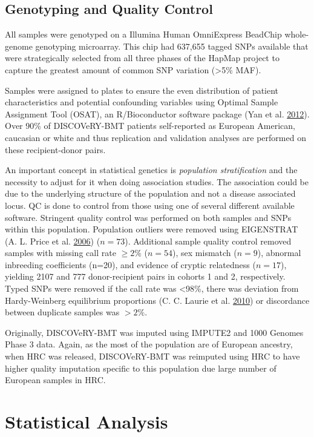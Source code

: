 \documentclass[]{DissertateOSU}
\begin{document}
\subsection{Genotyping and Quality
Control}\label{genotyping-and-quality-control}

All samples were genotyped on a Illumina Human OmniExpress BeadChip
whole-genome genotyping microarray. This chip had 637,655 tagged SNPs
available that were strategically selected from all three phases of the
HapMap project to capture the greatest amount of common SNP variation
(\textgreater{}5\% MAF).

Samples were assigned to plates to ensure the even distribution of
patient characteristics and potential confounding variables using
Optimal Sample Assignment Tool (OSAT), an R/Bioconductor software
package (Yan et al. \protect\hyperlink{ref-OSAT}{2012}). Over 90\% of
DISCOVeRY-BMT patients self-reported as European American, caucasian or
white and thus replication and validation analyses are performed on
these recipient-donor pairs.

An important concept in statistical genetics is \emph{population
stratification} and the necessity to adjust for it when doing
association studies. The association could be due to the underlying
structure of the population and not a disease associated locus. QC is
done to control from those using one of several different available
software. Stringent quality control was performed on both samples and
SNPs within this population. Population outliers were removed using
EIGENSTRAT (A. L. Price et al. \protect\hyperlink{ref-Price_AL}{2006})
(\(n=73\)). Additional sample quality control removed samples with
missing call rate \(\geq 2\%\) (\(n=54\)), sex mismatch (\(n=9\)),
abnormal inbreeding coefficients (n=20), and evidence of cryptic
relatedness (\(n=17\)), yielding 2107 and 777 donor-recipient pairs in
cohorts 1 and 2, respectively. Typed SNPs were removed if the call rate
was \textless{}98\%, there was deviation from Hardy-Weinberg equilibrium
proportions (C. C. Laurie et al.
\protect\hyperlink{ref-laurie2010}{2010}) or discordance between
duplicate samples was \(>2\%\).

Originally, DISCOVeRY-BMT was imputed using IMPUTE2 and 1000 Genomes
Phase 3 data. Again, as the most of the population are of European
ancestry, when HRC was released, DISCOVeRY-BMT was reimputed using HRC
to have higher quality imputation specific to this population due large
number of European samples in HRC.

\section{Statistical Analysis}\label{statistical-analysis}
\end{document}
